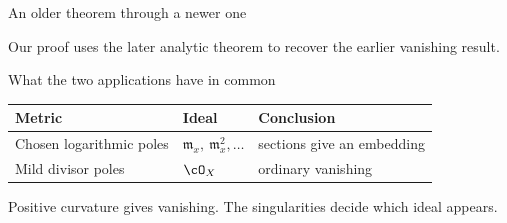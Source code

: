 \begin{frame}{An older theorem through a newer one}
\begin{center}
\end{center}
\bigskip
Our proof uses the later analytic theorem to recover the earlier vanishing result.
\end{frame}

\begin{frame}{What the two applications have in common}
\begin{center}
\renewcommand{\arraystretch}{1.8}
\begin{tabular}{lll}
Metric & Ideal & Conclusion\\
\hline
Chosen logarithmic poles & \(\mathfrak m_x,\ \mathfrak m_x^2,\ldots\) & sections give an embedding\\
Mild divisor poles & \(\cO_X\) & ordinary vanishing
\end{tabular}
\end{center}
\bigskip
Positive curvature gives vanishing.
The singularities decide which ideal appears.
\end{frame}

